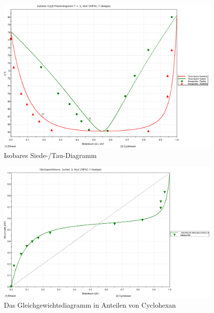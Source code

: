 \begin{figure}[h!]
	\centering
	\includegraphics[width=1.1\linewidth]{img/VLE-T-x-isobar}
	\caption{Isobares Siede-/Tau-Diagramm}
	\label{fig:T-x2-isobar}
\end{figure}

\begin{figure}[h!]
	\centering
	\includegraphics[width=1.1\linewidth]{img/gleichgewichtsdiagramm}
	\caption{Das Gleichgewichtsdiagramm in Anteilen von Cyclohexan}
	\label{fig:gleichgewichtsdiagramm}
\end{figure}














